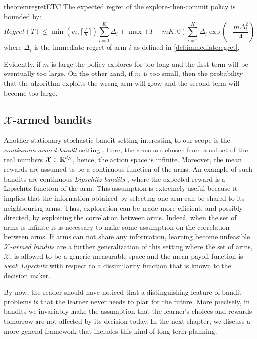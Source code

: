 \begin{restatable}{theorem}{regretETC}\label{th:regretETC}\cite{lattimore2019bandit}
The expected regret of the explore-then-commit policy is bounded by:
\begin{equation}
Regret(T) \leq \min\left(m, \lceil\tfrac{T}{K}\rceil\right)\sum_{i=1}^{K}\Delta_i+\max\left(T-mK, 0\right)\sum_{i=1}^{K}\Delta_i\exp\left(-\frac{m\Delta_i^2}{4}\right)
\end{equation}
where $\Delta_i$ is the immediate regret of arm $i$ as defined in \ref{def:immediateregret}.
\end{restatable}

Evidently, if $m$ is large  the policy explores for too long and the first term will be eventually too large. On the other hand, if $m$ is too small, then the probability that the algorithm exploits the wrong arm will grow and the second term will become too large.

\subsection{$\mathcal{X}$-armed bandits} \label{sub:xarmedbandits}
Another stationary stochastic bandit setting interesting to our scope is the \emph{continuum-armed bandit} setting \cite{agrawal1995continuum}. Here, the arms are chosen from a subset of the real numbers $\mathcal{X}\in\mathbb{R}^{d_{\mathcal{X}}} $, hence, the action space is infinite. Moreover, the mean rewards are assumed to be a continuous function of the arms. An example of such bandits are continuous \emph{Lipschitz bandits} \cite{magureanu2014lipschitz}, where the expected reward is a Lipschitz function of the arm. This assumption is extremely useful because it implies that the information obtained by selecting one arm can be shared to its neighbouring arms. Thus, exploration can be made more efficient, and possibly directed, by exploiting the correlation between arms. Indeed, when the set of arms is infinite it is necessary to make some assumption on the correlation between arms. If arms can not share any information, learning become unfeasible. \emph{$\mathcal{X}$-armed bandits} \cite{bubeck2011x} are a further generalization of this setting where the set of arms, $\mathcal{X}$, is allowed to be a generic measurable space and the mean-payoff function is \emph{weak Lipschitz} with respect to a dissimilarity function that is known to the decision maker.


By now, the reader should have noticed that a distinguishing feature of bandit problems is that the learner never needs to plan for the future. More precisely, in bandits we invariably make the assumption that the learner’s choices and rewards tomorrow are not affected by its decision today. In the next chapter, we discuss a more general framework that includes this kind of long-term planning.


